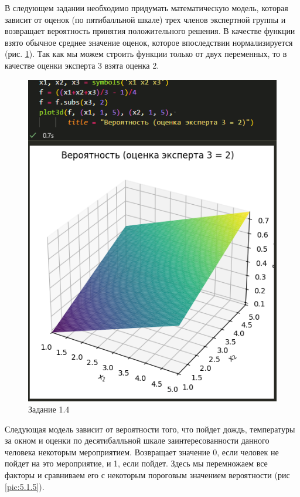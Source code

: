 \documentclass[14pt,a4paper]{extarticle}
\begin{document}
В следующем задании необходимо придумать математическую модель,
которая зависит от оценок (по пятибалльной шкале) трех членов
экспертной группы и возвращает вероятность принятия
положительного решения. В качестве функции взято обычное среднее
значение оценок, которое впоследствии нормализируется (рис. \ref{pic:5.1.4}).
Так как мы можем строить функции только от двух переменных,
то в качестве оценки эксперта 3 взята оценка 2.

\begin{figure}
    [ht!]\centering
    \includegraphics[width=0.6\linewidth]{figures/5.1/4.png}
    \caption{Задание 1.4}
    \label{pic:5.1.4}
\end{figure}
\newpage

Следующая модель зависит от вероятности того, что пойдет дождь,
температуры за окном и оценки по десятибалльной шкале
заинтересованности данного человека некоторым мероприятием.
Возвращает значение 0, если человек не пойдет на это мероприятие,
и 1, если пойдет. Здесь мы перемножаем все факторы и сравниваем
его с некоторым пороговым значением вероятности (рис \ref{pic:5.1.5}).
\end{document}

